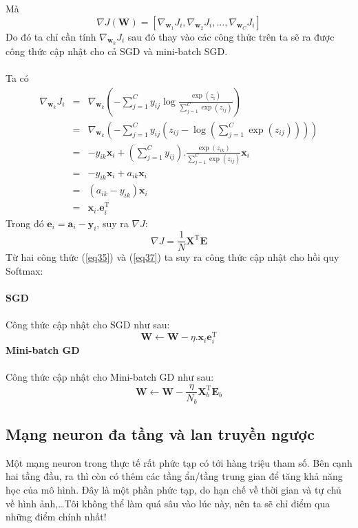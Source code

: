 \documentclass{article}
\begin{document}
Mà 
\begin{equation}
    \nabla J(\textbf{W}) = [\nabla_{\textbf{w}_1}J_i, \nabla_{\textbf{w}_2}J_i,\ldots,\nabla_{\textbf{w}_C}J_i]
\end{equation}
Do đó ta chỉ cần tính $\nabla_{\textbf{w}_k}J_i$ sau đó thay vào các công thức trên ta sẽ ra được công thức cập nhật cho cả SGD và mini-batch SGD.\\\\
Ta có
\begin{eqnarray} 
\label{eq31}
\nabla_{\textbf{w}_k}J_i &=& \nabla_{\textbf{w}_k} \left( -\sum_{j=1}^{C}y_{ij}\log{\frac{\exp(z_{ị})}{\sum_{j=1}^{C}\exp(z_{ij})}} \right)  \\
\label{eq32}
&=& \nabla_{\textbf{w}_k} \left( -\sum_{j=1}^{C}y_{ij} \left( z_{ij} - \log(\sum_{j=1}^{C}\exp(z_{ij})) \right) \right)\\
&=& -y_{ik}\textbf{x}_i + \left(\sum_{j=1}^{C}y_{ij}\right).\frac{\exp(z_{ik})}{\sum_{j=1}^{C}\exp(z_{ij})}\textbf{x}_i\\
 \label{eq33}
 &=& -y_{ik}\textbf{x}_{i}+a_{ik}\textbf{x}_i\\
 \label{eq34}
 &=& (a_{ik}-y_{ik})\textbf{x}_i\\
 \label{eq35}
 &=& \textbf{x}_i.\textbf{e}_{i}^{\text{T}}
\end{eqnarray}
Trong đó $\textbf{e}_i = \textbf{a}_i - \textbf{y}_i$, suy ra $\nabla J$:
\begin{equation}
    \nabla J = \frac{1}{N}\textbf{X}^{\text{T}}\textbf{E}
    \label{eq37}
\end{equation}
Từ hai công thức (\ref{eq35}) và (\ref{eq37}) ta suy ra công thức cập nhật cho hồi quy Softmax:\\\\
\textbf{SGD}\\\\
Công thức cập nhật cho SGD như sau:
\begin{equation}
    \textbf{W} \leftarrow \textbf{W} - \eta.\textbf{x}_i\textbf{e}_i^{\text{T}}
    \label{eq38}
\end{equation}
\textbf{Mini-batch GD}\\\\
Công thức cập nhật cho Mini-batch GD như sau:
\begin{equation}
    \textbf{W} \leftarrow \textbf{W} - \frac{\eta}{N_b} \textbf{X}_{b}^{\text{T}}\textbf{E}_{b}
\end{equation}
\subsection{Mạng neuron đa tầng và lan truyền ngược}
Một mạng neuron trong thực tế rất phức tạp có tới hàng triệu tham số. Bên cạnh hai tầng đầu, ra thì còn có thêm các tầng ẩn/tầng trung gian để tăng khả năng học của mô hình. Đây là một phần phức tạp, do hạn chế về thời gian và tự chủ về hình ảnh,\ldots Tôi không thể làm quá sâu vào lúc này, nên ta sẽ chỉ điểm qua những điểm chính nhất!
\end{document}
